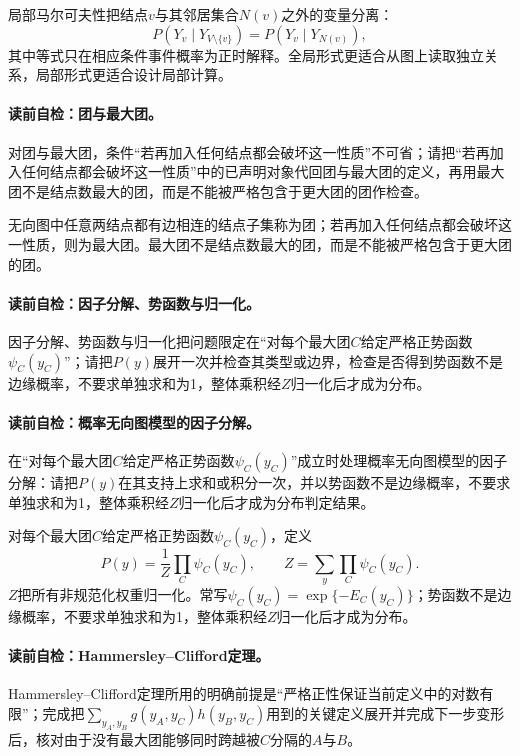局部马尔可夫性把结点$v$与其邻居集合$N(v)$之外的变量分离：
\[
P(Y_v\mid Y_{V\setminus\{v\}})
=P(Y_v\mid Y_{N(v)}),
\]
其中等式只在相应条件事件概率为正时解释。全局形式更适合从图上读取独立关系，局部形式更适合设计局部计算。

\paragraph{读前自检：团与最大团。}对团与最大团，条件“若再加入任何结点都会破坏这一性质”不可省；请把“若再加入任何结点都会破坏这一性质”中的已声明对象代回团与最大团的定义，再用最大团不是结点数最大的团，而是不能被严格包含于更大团的团作检查。\par

无向图中任意两结点都有边相连的结点子集称为团；若再加入任何结点都会破坏这一性质，则为最大团。最大团不是结点数最大的团，而是不能被严格包含于更大团的团。

\paragraph{读前自检：因子分解、势函数与归一化。}因子分解、势函数与归一化把问题限定在“对每个最大团$C$给定严格正势函数$\psi_C(y_C)$”；请把$P(y)$展开一次并检查其类型或边界，检查是否得到势函数不是边缘概率，不要求单独求和为1，整体乘积经$Z$归一化后才成为分布。\par
\paragraph{读前自检：概率无向图模型的因子分解。}在“对每个最大团$C$给定严格正势函数$\psi_C(y_C)$”成立时处理概率无向图模型的因子分解：请把$P(y)$在其支持上求和或积分一次，并以势函数不是边缘概率，不要求单独求和为1，整体乘积经$Z$归一化后才成为分布判定结果。\par

对每个最大团$C$给定严格正势函数$\psi_C(y_C)$，定义
\[
P(y)=\frac1Z\prod_C\psi_C(y_C),\qquad
Z=\sum_{y}\prod_C\psi_C(y_C).
\]
$Z$把所有非规范化权重归一化。常写$\psi_C(y_C)=\exp\{-E_C(y_C)\}$；势函数不是边缘概率，不要求单独求和为1，整体乘积经$Z$归一化后才成为分布。

\paragraph{读前自检：Hammersley--Clifford定理。}Hammersley--Clifford定理所用的明确前提是“严格正性保证当前定义中的对数有限”；完成把$\sum_{y_A,y_B}g(y_A,y_C)h(y_B,y_C)$用到的关键定义展开并完成下一步变形后，核对由于没有最大团能够同时跨越被$C$分隔的$A$与$B$。\par

